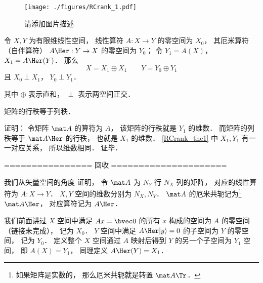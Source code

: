 
\begin{issues}
\issueDraft
\end{issues}


\begin{figure}[ht]
\centering
\texttt{[image: ./figures/RCrank\_1.pdf]}
\caption{请添加图片描述} \label{RCrank_fig1}
\end{figure}

\begin{theorem}{}\label{RCrank_the1}
令 $X, Y$ 为有限维线性空间， 线性算符 $A:X \to Y$ 的零空间为 $X_0$， 其厄米算符（自伴算符） $A\Her: Y \to X$ 的零空间为 $Y_0$； 令 $Y_1 = A(X)$， $X_1 = A\Her(Y)$． 那么
\begin{equation}
X = X_1 \oplus X_1 \qquad Y = Y_0 \oplus Y_1
\end{equation}
且 $X_0 \perp X_1$， $Y_0 \perp Y_1$．
\end{theorem}
其中 $\oplus$ 表示直和， $\perp$ 表示两空间正交．


\begin{corollary}{}
矩阵的行秩等于列秩．
\end{corollary}
证明： 令矩阵 $\mat A$ 的算符为 $A$， 该矩阵的行秩就是 $Y_1$ 的维数． 而矩阵的列秩等于 $\mat A\Her$ 的行秩， 也就是 $X_1$ 的维数． \autoref{RCrank_the1} 中 $X_1, Y_1$ 有一一对应关系， 所以维数相同． 证毕．

================ 回收 =====================

我们从矢量空间的角度 证明， 令 $\mat A$ 为 $N_Y$ 行 $N_X$ 列的矩阵， 对应的线性算符为 $A: X\to Y$． $X, Y$ 空间的维数分别为 $N_X, N_Y$． $\mat A$ 的厄米共轭记为\footnote{如果矩阵是实数的， 那么厄米共轭就是转置 $\mat A\Tr$．} $\mat A\Her$， 对应算符记为 $A\Her$．

我们前面讲过 $X$ 空间中满足 $A {x} = \bvec 0$ 的所有 ${x}$ 构成的空间为 $A$ 的零空间（链接未完成）， 记为 $X_0$． $Y$ 空间中满足 $A\Her |y\rangle = 0$ 的子空间为 $Y$ 的零空间， 记为 $Y_0$． 定义整个 $X$ 空间通过 $A$ 映射后得到 $Y$ 的另一个子空间为 $Y_1$ 空间， 即 $A(X) = Y_1$， 同理定义 $A\Her(Y) = X_1$． %

